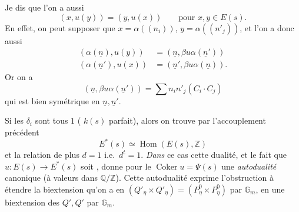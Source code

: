 \documentclass[11pt,a4paper]{article}
\begin{document}
 Je dis que l'on a aussi
\[
(x, u(y)) = (y, u(x)) \qquad \text{pour } x, y \in E(s).
\]
En effet, on peut supposer que $x = \alpha((n_i))$, $y = \alpha((n'_j))$,
et l'on a donc aussi  \ill{}
\[
\begin{aligned}
(\alpha(\underline{n}), u(y)) &= (\underline{n}, \beta u \alpha(\underline{n}')) \\
(\alpha(\underline{n}'), u(x)) &= (\underline{n}', \beta u \alpha(\underline{n})) .
\end{aligned}
\]
Or on a
\[
(\underline{n}, \beta u \alpha(\underline{n}')) = \sum n_i n'_j (C_i \cdot C_j)
\]
qui est bien symétrique en $\underline{n}, \underline{n}'$.

Si les $\delta_i$ sont tous $1$ ( $k(s)$ parfait), alors on
trouve par l'accouplement précédent
\[
E^*(s) \simeq \operatorname{Hom}(E(s), \mathbb{Z})
\]
et la relation  \ill{} de plus $d = 1$ i.e.\ $d^t = 1$.
\emph{Dans} ce cas cette dualité, et le fait que $u \colon E(s) \to E^*(s)$
soit , donne pour le
$\operatorname{Coker} u = \Psi(s)$ une \emph{autodualité} canonique (à valeurs
dans $\mathbb{Q}/\mathbb{Z}$). Cette autodualité \struck{\ill{}} exprime
l'obstruction à étendre la biextension qu'on a en
$(Q'_\eta \times Q'_\eta) = (P^0_\eta \times P^0_\eta)$ par
$\mathbb{G}_m$, en une biextension des $Q', Q'$ par $\mathbb{G}_m$.
\end{document}
